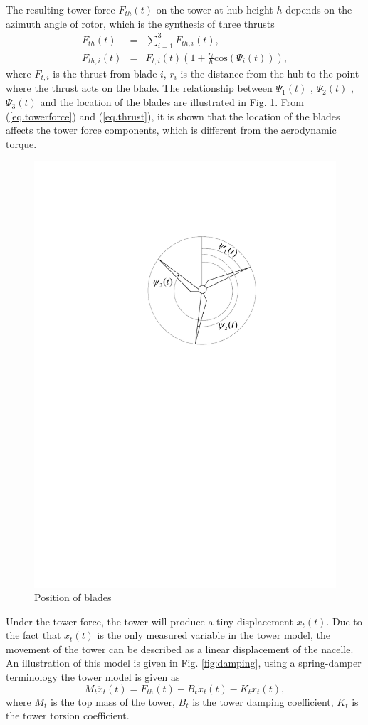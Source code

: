 \documentclass{article}
\begin{document}
The resulting tower force  $F_{th}(t)$ on the tower at hub
height $h$ depends on the azimuth angle of rotor, which
is the synthesis of three thrusts \cite{ref:8}
\begin{eqnarray}
  F_{th}(t) &=& \sum^{3}_{i=1}F_{th,i}(t) \label{eq.towerforce}, \\
  F_{th,i}(t) &=& F_{t,i}(t)(1+\frac{r_t}{h}\mathrm{cos}(\Psi_i(t))) \label{eq.thrust},
\end{eqnarray}
where $F_{t,i}$ is the thrust from blade $i$, $r_i$ is the
 distance from the hub to the point where the thrust acts on the blade.
 The relationship between $\Psi_1(t)$ , $\Psi_2(t)$ , $\Psi_3(t)$
  and the location of the blades are illustrated in Fig. \ref{fig:position}.
From (\ref{eq.towerforce}) and (\ref{eq.thrust}), it is shown that the location of the blades affects the tower
  force components, which is  different from the aerodynamic torque.

\begin{figure}[!htb]
  \centering
  \includegraphics[width=0.4\hsize]{Visio-bladelocation.pdf}
  \caption{Position of blades}
  \label{fig:position}
\end{figure}

Under the tower force, the tower will produce a tiny
displacement  $x_t(t)$. Due to the fact that $x_t(t)$ is the only measured variable in the tower
 model, the movement of the tower can be described as a linear
 displacement of the nacelle. An illustration of this model is given in Fig. \ref{fig:damping},
using a spring-damper terminology the tower model is
 given as
\begin{equation} \label{eq.tower}
  M_t\ddot{x}_t(t) = F_{th}(t) - B_t\dot{x}_t(t) - K_tx_t(t),
\end{equation}
where $M_t$ is the top mass of the tower, $B_t$  is the
tower damping coefficient, $K_t$  is the tower torsion coefficient.
\end{document}
